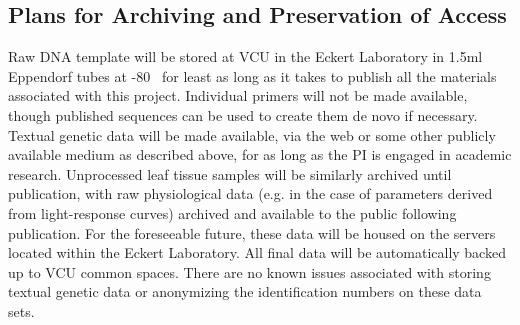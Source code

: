 \subsection*{Plans for Archiving and Preservation of Access}
Raw DNA template will be stored at VCU in the Eckert Laboratory in 1.5ml Eppendorf tubes at -80 \celsius\ for least as 
long as it takes to publish all the materials associated with this project. Individual primers will not be made available, 
though published sequences can be used to create them de novo if necessary. Textual genetic data will be made 
available, via the web or some other publicly available medium as described above, for as long as the PI is 
engaged in academic research. Unprocessed leaf tissue samples will be similarly archived until publication, with 
raw physiological data (e.g. in the case of parameters derived from light-response curves) archived and available 
to the public following publication. For the foreseeable future, these data will be housed on the servers located within 
the Eckert Laboratory. All final data will be automatically backed up to VCU common spaces. There are no known 
issues associated with storing textual genetic data or anonymizing the identification numbers on these data sets.





















